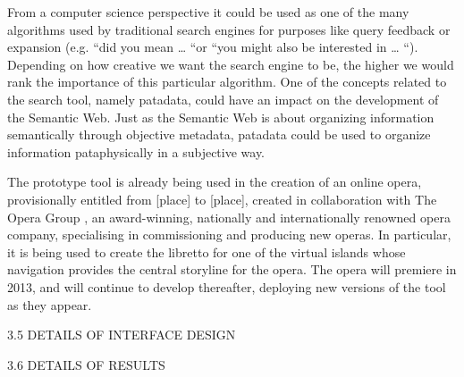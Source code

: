 From a computer science perspective it could be used as one of the many algorithms used by traditional search engines for purposes like query feedback or expansion (e.g. “did you mean … “or “you might also be interested in … “). Depending on how creative we want the search engine to be, the higher we would rank the importance of this particular algorithm. One of the concepts related to the search tool, namely patadata, could have an impact on the development of the Semantic Web. Just as the Semantic Web is about organizing information semantically through objective metadata, patadata could be used to organize information pataphysically in a subjective way.

The prototype tool is already being used in the creation of an online opera, provisionally entitled from [place] to [place], created in collaboration with The Opera Group , an award-winning, nationally and internationally renowned opera company, specialising in commissioning and producing new operas. In particular, it is being used to create the libretto for one of the virtual islands whose navigation provides the central storyline for the opera. The opera will premiere in 2013, and will continue to develop thereafter, deploying new versions of the tool as they appear.

3.5	DETAILS OF INTERFACE DESIGN

3.6	DETAILS OF RESULTS

